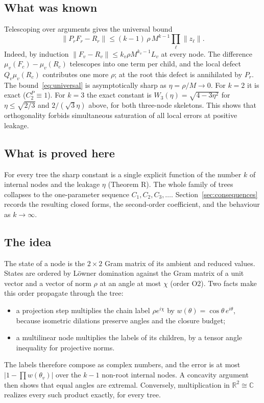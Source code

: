 \documentclass[11pt]{amsart}
\theoremstyle{definition}
\newcommand{\R}{\mathbb{R}}
\newcommand{\C}{\mathbb{C}}
\newcommand{\norm}[1]{\lVert #1\rVert}
\newcommand{\abs}[1]{\lvert #1\rvert}
\begin{document}
\subsection*{What was known}
Telescoping over arguments gives the universal bound
\begin{equation}\label{eq:universal}
\norm{P_rF_r-R_r}\le(k-1)\,\rho\,M^{k-1}\prod_\ell\norm{z_\ell}.
\end{equation}
Indeed, by induction $\norm{F_v-R_v}\le k_v\rho M^{k_v-1}L_v$ at every node. The
difference $\mu_v(F_c)-\mu_v(R_c)$ telescopes into one term per child, and the local
defect $Q_v\mu_v(R_c)$ contributes one more $\rho$; at the root this defect is
annihilated by $P_r$. The bound~\eqref{eq:universal} is asymptotically sharp as
$\eta=\rho/M\to0$. For $k=2$ it is exact ($C_2^P\equiv1$). For $k=3$ the exact
constant is $W_3(\eta)=\sqrt{4-3\eta^2}$ for $\eta\le\sqrt{2/3}$ and $2/(\sqrt3\eta)$
above, for both three-node skeletons. This shows that orthogonality forbids
simultaneous saturation of all local errors at positive leakage.

\subsection*{What is proved here}
For every tree the sharp constant is a single explicit function of the number $k$ of
internal nodes and the leakage $\eta$ (Theorem R). The whole family of trees collapses
to the one-parameter sequence $C_1,C_2,C_3,\dots$. Section~\ref{sec:consequences}
records the resulting closed forms, the second-order coefficient, and the behaviour
as $k\to\infty$.

\subsection*{The idea}
The state of a node is the $2\times2$ Gram matrix of its ambient and reduced values.
States are ordered by Löwner domination against the Gram matrix of a unit vector and
a vector of norm $\rho$ at an angle at most $\chi$ (order O2). Two facts make this
order propagate through the tree:
\begin{itemize}
\item a projection step multiplies the chain label $\rho e^{i\chi}$ by
  $w(\theta)=\cos\theta\,e^{i\theta}$, because isometric dilations preserve angles and
  the closure budget;
\item a multilinear node multiplies the labels of its children, by a tensor angle
  inequality for projective norms.
\end{itemize}
The labels therefore compose as complex numbers, and the error is at most
$\abs{1-\prod w(\theta_v)}$ over the $k-1$ non-root internal nodes. A concavity
argument then shows that equal angles are extremal. Conversely, multiplication in
$\R^2\cong\C$ realizes every such product exactly, for every tree.
\end{document}
